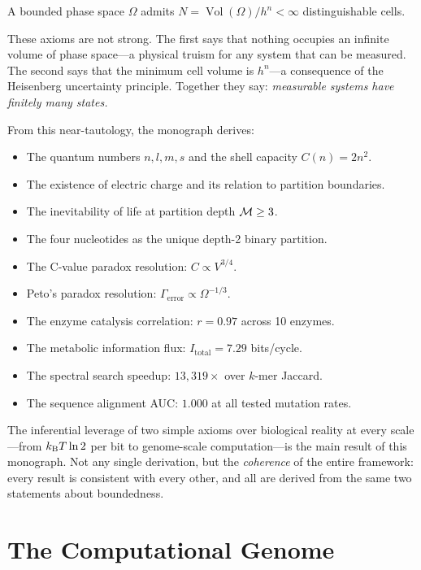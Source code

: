 \begin{axiom}
A bounded phase space $\Omega$ admits $N = \operatorname{Vol}(\Omega)/h^n < \infty$
distinguishable cells.
\end{axiom}

These axioms are not strong. The first says that nothing occupies an infinite
volume of phase space---a physical truism for any system that can be measured.
The second says that the minimum cell volume is $h^n$---a consequence of the
Heisenberg uncertainty principle. Together they say: \emph{measurable systems
have finitely many states.}

From this near-tautology, the monograph derives:
\begin{itemize}
  \item The quantum numbers $n, l, m, s$ and the shell capacity $C(n) = 2n^2$.
  \item The existence of electric charge and its relation to partition boundaries.
  \item The inevitability of life at partition depth $\mathcal{M} \geq 3$.
  \item The four nucleotides as the unique depth-2 binary partition.
  \item The C-value paradox resolution: $C \propto V^{3/4}$.
  \item Peto's paradox resolution: $\Gamma_{\mathrm{error}} \propto \Omega^{-1/3}$.
  \item The enzyme catalysis correlation: $r = 0.97$ across 10 enzymes.
  \item The metabolic information flux: $I_{\mathrm{total}} = 7.29$ bits/cycle.
  \item The spectral search speedup: $13,\!319\times$ over $k$-mer Jaccard.
  \item The sequence alignment AUC: $1.000$ at all tested mutation rates.
\end{itemize}

The inferential leverage of two simple axioms over biological reality at every
scale---from $k_{\mathrm{B}} T \ln 2$ per bit to genome-scale computation---is the main
result of this monograph. Not any single derivation, but the \emph{coherence}
of the entire framework: every result is consistent with every other, and all
are derived from the same two statements about boundedness.

\section{The Computational Genome}
\label{sec:computational_genome}

